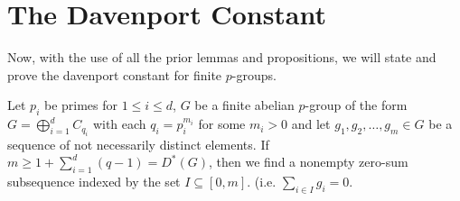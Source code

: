 \section{The Davenport Constant}
Now, with the use of all the prior lemmas and propositions, we will state and prove the davenport constant for finite \(p\)-groups.
\begin{theorem}
	Let \(p_{i}\) be primes for \(1 \le i \le d\), \(G\) be a finite abelian \(p\)-group of the form \(G = \bigoplus _{i=1}^{d} C_{q_{i}}\) with each \(q_{i} = p_{i}^{m_{i}}\) for some \(m_{i} > 0\) and let \(g_1, g_2, \ldots, g_{m} \in G\) be a sequence of not necessarily distinct elements. If \(m \ge 1 + \sum_{i= 1}^{d} \left( q-1 \right) = D^{*}\left( G \right)  \), then we find a nonempty zero-sum subsequence indexed by the set \(I \subseteq \left[ 0, m \right] \). (i.e. \(\sum_{i \in I}^{} g_{i} = 0\).
\end{theorem}
